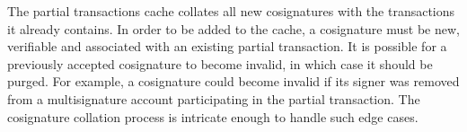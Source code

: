 \begin{figure}
\end{figure}

The partial transactions cache collates all new cosignatures with the transactions it already contains.
In order to be added to the cache, a cosignature must be new, verifiable and associated with an existing partial transaction.
It is possible for a previously accepted cosignature to become invalid, in which case it should be purged.
For example, a cosignature could become invalid if its signer was removed from a multisignature account participating in the partial transaction.
The cosignature collation process is intricate enough to handle such edge cases.

\begin{figure}
	\label{fig:partials:flowchart:cosignature}
\end{figure}
